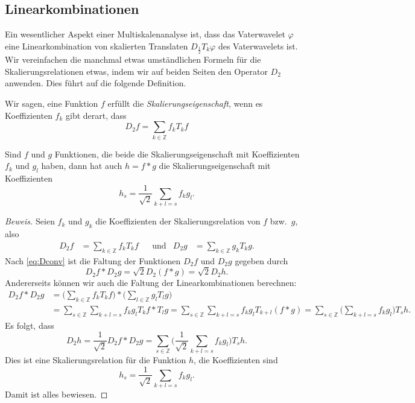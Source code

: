\subsection{Linearkombinationen
\label{subsection:linearkombinationen}}
Ein wesentlicher Aspekt einer Multiskalenanalyse ist, dass das
Vaterwavelet $\varphi$ eine Linearkombination von skalierten
Translaten $D_{\frac12}T_k\varphi$ des Vaterwavelets ist.
Wir vereinfachen die manchmal etwas umständlichen Formeln für
die Skalierungsrelationen etwas, indem wir auf beiden Seiten
den Operator $D_2$ anwenden.
Dies führt auf die folgende Definition.

\begin{definition}
Wir sagen, eine Funktion $f$ erfüllt die {\em Skalierungseigenschaft},
wenn es Koeffizienten $f_k$ gibt derart, dass
\[
D_2f = \sum_{k\in\mathbb Z} f_k T_kf
\]
\end{definition}

\begin{satz}
\label{satz:faltung-linearkombination}
Sind $f$ und $g$ Funktionen, die beide die Skalierungseigenschaft
mit Koeffizienten $f_k$ und $g_l$
haben, dann hat auch $h=f*g$ die Skalierungseigenschaft
mit Koeffizienten
\begin{equation}
h_s = \frac1{\sqrt{2}} \sum_{k+l=s}f_kg_l.
\label{eq:faltung-linearkombination}
\end{equation}
\end{satz}

\begin{proof}[Beweis]
Seien $f_k$ und $g_k$ die Koeffizienten der Skalierungsrelation von $f$
bzw.~$g$, also
\begin{align*}
D_2f
&=
\sum_{k\in\mathbb Z} f_k T_kf
&
&\text{und}&
D_2g
&=
\sum_{k\in\mathbb Z} g_k T_kg.
\end{align*}
Nach \eqref{eq:Dconv} ist die Faltung der Funktionen $D_2f$ und $D_2g$
gegeben durch
\[
D_2f * D_2g
=
\sqrt{2}
D_2(f*g)
=
\sqrt{2}
D_2h.
\]
Andererseits können wir auch die Faltung der Linearkombinationen 
berechnen:
\begin{align*}
D_2f * D_2g
&=
\biggl( \sum_{k\in\mathbb Z} f_kT_kf \biggr)
*
\biggl( \sum_{l\in\mathbb Z} g_lT_lg \biggr)
\\
&=
\sum_{s\in\mathbb Z}
\sum_{k+l=s} f_kg_l T_kf * T_lg
=
\sum_{s\in\mathbb Z}
\sum_{k+l=s} f_kg_l T_{k+l}(f * g)
=
\sum_{s\in\mathbb Z}
\biggl(\sum_{k+l=s} f_kg_l\biggr) T_sh.
\end{align*}
Es folgt, dass
\[
D_2h
=
\frac1{\sqrt{2}} D_2f * D_2g
=
\sum_{s\in\mathbb Z}
\biggl(\frac1{\sqrt{2}}\sum_{k+l=s} f_kg_l\biggr) T_sh.
\]
Dies ist eine Skalierungsrelation für die Funktion $h$, die Koeffizienten
sind
\[
h_s = \frac1{\sqrt{2}} \sum_{k+l=s}f_kg_l.
\]
Damit ist alles bewiesen.
\end{proof}

